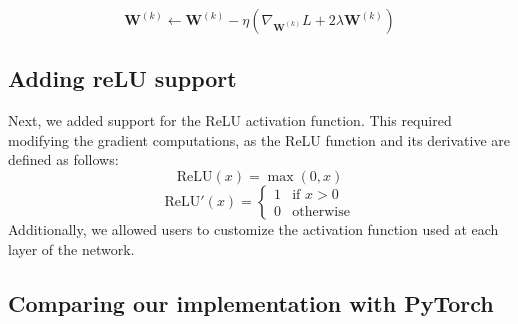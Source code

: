 \documentclass[9pt]{IEEEtran}
\begin{document}
\[
\mathbf{W}^{(k)} \leftarrow \mathbf{W}^{(k)} - \eta \left( \nabla_{\mathbf{W}^{(k)}} L + 2\lambda \mathbf{W}^{(k)} \right)
\]

\subsection{Adding reLU support}
Next, we added support for the ReLU activation function. This required modifying the gradient computations, as the ReLU function and its derivative are defined as follows:
\[
\text{ReLU}(x) = \max(0, x)
\]
\[
\text{ReLU}'(x) =
\begin{cases}
1 & \text{if } x > 0 \\
0 & \text{otherwise}
\end{cases}
\]
Additionally, we allowed users to customize the activation function used at each layer of the network.

\subsection{Comparing our implementation with PyTorch}



\end{document}
